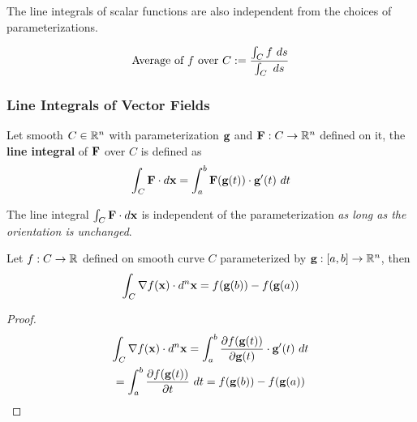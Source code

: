 \documentclass[11pt]{article}
\begin{document}
			\begin{remark}
				The line integrals of scalar functions are also independent from the choices of parameterizations.
			\end{remark}
			
			\begin{definition}
				\begin{equation}
					\text{{Average of $f$ over $C$}} := \frac{\int_C f\ ds}{\int_C\ ds}
				\end{equation}
			\end{definition}
			
		\subsubsection{Line Integrals of Vector Fields}
			\begin{definition} Let smooth $C \in \mathbb{R}^n$ with parameterization $\textbf{g}$ and $\textbf{F}: C \to \mathbb{R}^n$ defined on it, the \textbf{line integral} of $\textbf{F}$ over $C$ is defined as 
				\begin{equation}
					\int_C \textbf{F}\cdot d\textbf{x} = \int_a^b \textbf{F}(\textbf{g}(t)) \cdot \textbf{g}'(t)\ dt
				\end{equation}
			\end{definition}
			
			\begin{proposition}
				The line integral $\int_C \textbf{F}\cdot d\textbf{x}$ is independent of the parameterization \emph{as long as the orientation is unchanged}.
			\end{proposition}
			
			\begin{theorem}
				Let $f: C \to \mathbb{R}$ defined on smooth curve $C$ parameterized by $\textbf{g}:[a, b] \to \mathbb{R}^n$, then
				\begin{equation}
					\int_C \nabla f(\textbf{x}) \cdot d^n\textbf{x} = f(\textbf{g}(b)) - f(\textbf{g}(a))
				\end{equation}
				\begin{proof}
					\begin{gather}
						\int_C \nabla f(\textbf{x}) \cdot d^n\textbf{x} 
						= \int_a^b \frac{\partial{f(\textbf{g}(t))}}{\partial{\textbf{g}(t)}} \cdot \textbf{g}'(t)\ dt \\
						= \int_a^b \frac{\partial{f(\textbf{g}(t))}}{\partial{t}}\ dt
						= f(\textbf{g}(b)) - f(\textbf{g}(a))
					\end{gather}
				\end{proof}
			\end{theorem}
			
\end{document}
